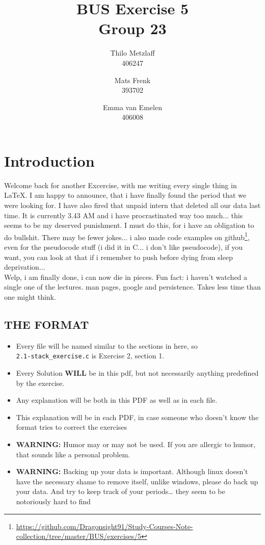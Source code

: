 \documentclass[a4paper, 11pt]{article}
\author{Thilo Metzlaff\\406247 \and Mats Frenk\\393702\and Emma van Emelen\\406008}
\title{BUS Exercise 5 \\ Group 23}
\begin{document}
    \maketitle
    \newpage

    \tableofcontents
    \newpage

    \section*{Introduction}
    Welcome back for another Excercise, with me writing every single thing in \LaTeX{}. I am happy to announce, that i have finally found the period that we were looking for.
    I have also fired that unpaid intern that deleted all our data last time. It is currently 3.43 AM and i have procrastinated way too much... this seems to be my deserved punishment.
    I must do this, for i have an obligation to do bullshit. There may be fewer jokes... i also made code examples on github\footnote{\url{https://github.com/Dragonsight91/Study-Courses-Note-collection/tree/master/BUS/exercises/5}}, even for the pseudocode stuff
    (i did it in C... i don't like pseudocode), if you want, you can look at that if i remember to push before dying from sleep deprivation...\\
    Welp, i am finally done, i can now die in pieces. Fun fact: i haven't watched a single one of the lectures. man pages, google and persistence. Takes less time than one might think. 

    

    \subsection*{THE FORMAT}
    \begin{itemize}
      \item Every file will be named similar to the sections in here, so\\
      \texttt{2.1-stack\_exercise.c} is Exercise 2, section 1.
      \item Every Solution \textbf{WILL} be in this pdf, but not necessarily 
            anything predefined by the exercise.
      \item Any explanation will be both in this PDF as well as in each file.
      \item This explanation will be in each PDF, in case someone who doesn't
            know the format tries to correct the exercises
      \item \textbf{WARNING:} Humor may or may not be used. If you are allergic
            to humor, that sounds like a personal problem.
      \item \textbf{WARNING:} Backing up your data is important. Although linux 
            doesn't have the necessary shame to remove itself, unlike windows,
            please do back up your data. And try to keep track of your periods\dots
            they seem to be notoriously hard to find
    \end{itemize}
    \newpage
\end{document}
